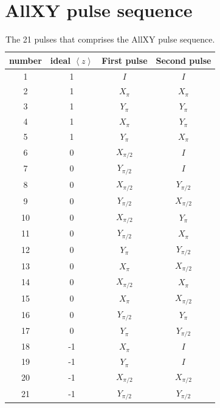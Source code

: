     \chapter{AllXY pulse sequence}
      \label{ch:AllXY pulse table}

      \begin{table}[h]
        \centering
        \begin{tabular}{c c c c }
          \toprule
          number & ideal $\left<z\right>$ & First pulse & Second pulse \\
          \midrule
          1  & 1  & $I$         & $I$         \\
          2  & 1  & $X_\pi$     & $X_\pi$     \\
          3  & 1  & $Y_\pi$     & $Y_\pi$     \\
          4  & 1  & $X_\pi$     & $Y_\pi$     \\
          5  & 1  & $Y_\pi$     & $X_\pi$     \\
          6  & 0  & $X_{\pi/2}$ & $I$         \\
          7  & 0  & $Y_{\pi/2}$ & $I$         \\
          8  & 0  & $X_{\pi/2}$ & $Y_{\pi/2}$ \\
          9  & 0  & $Y_{\pi/2}$ & $X_{\pi/2}$ \\
          10 & 0  & $X_{\pi/2}$ & $Y_\pi$     \\
          11 & 0  & $Y_{\pi/2}$ & $X_\pi$     \\
          12 & 0  & $Y_\pi$     & $Y_{\pi/2}$ \\
          13 & 0  & $X_\pi$     & $X_{\pi/2}$ \\
          14 & 0  & $X_{\pi/2}$ & $X_\pi$     \\
          15 & 0  & $X_\pi$     & $X_{\pi/2}$ \\
          16 & 0  & $Y_{\pi/2}$ & $Y_\pi$     \\
          17 & 0  & $Y_\pi$     & $Y_{\pi/2}$ \\
          18 & -1 & $X_\pi$     & $I$         \\
          19 & -1 & $Y_\pi$     & $I$         \\
          20 & -1 & $X_{\pi/2}$ & $X_{\pi/2}$ \\
          21 & -1 & $Y_{\pi/2}$ & $Y_{\pi/2}$ \\
          \bottomrule
        \end{tabular}
        \caption{The 21 pulses that comprises the AllXY pulse sequence.}
        \label{tab:AllXY sequence}
      \end{table}

